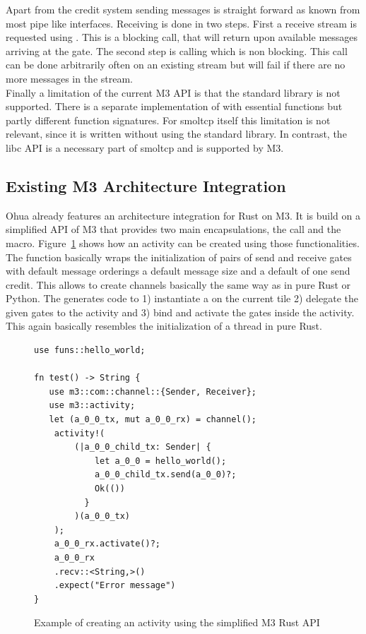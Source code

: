 Apart from the credit system sending messages is straight forward as known from most pipe like interfaces. Receiving is done in two steps. First a receive stream is requested using . This is a blocking call, that will return upon available messages arriving at the gate. The second step is calling  which is non blocking. This call can be done arbitrarily often on an existing stream but will fail if there are no more messages in the stream.\\

Finally a limitation of the current M3 API is that the standard library is not supported. There is a separate implementation of  with essential functions but partly different function signatures. For smoltcp itself this limitation is not relevant, since it is written without using the standard library. In contrast, the libc API is a necessary part of smoltcp and is supported by M3. 

\subsection{Existing M3 Architecture Integration}
Ohua already features an architecture integration for Rust on M3. It is build on a simplified API of M3 that provides two main encapsulations, the  call and the  macro. Figure~\ref{fig:OhuaM3Wrapper} shows how an activity can be created using those functionalities. The function  basically wraps the initialization of pairs of send and receive gates with default message orderings a default message size and a default of one send credit. This allows to create channels basically the same way as in pure Rust or Python. The  generates code to 1) instantiate a  on the current tile  2) delegate the given gates to the activity and 3) bind and activate the gates inside the activity. This again basically resembles the initialization of a thread in pure Rust. 


\begin{figure}
    \centering
    \begin{verbatim}
use funs::hello_world;

fn test() -> String {
   use m3::com::channel::{Sender, Receiver};
   use m3::activity;
   let (a_0_0_tx, mut a_0_0_rx) = channel(); 
    activity!(
        (|a_0_0_child_tx: Sender| {    
            let a_0_0 = hello_world();
            a_0_0_child_tx.send(a_0_0)?;
            Ok(())
          }
        )(a_0_0_tx)
    );
    a_0_0_rx.activate()?;
    a_0_0_rx
    .recv::<String,>()
    .expect("Error message")
}

    \end{verbatim}
    \caption{Example of creating an activity using the simplified M3 Rust API}
    \label{fig:OhuaM3Wrapper}
\end{figure}


